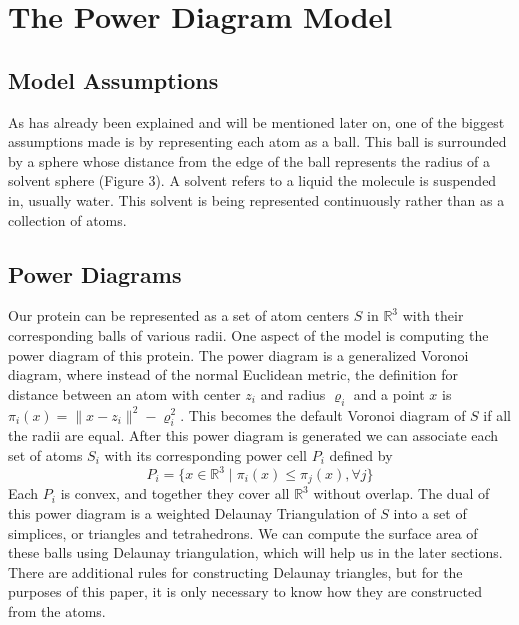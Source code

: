 \documentclass{article}
\newcommand{\R}{\mathbb{R}}
\begin{document}
\section{The Power Diagram Model}
\subsection{Model Assumptions}
As has already been explained and will be mentioned later on, one of the biggest assumptions made is by representing each atom as a ball. This ball is surrounded by a sphere whose distance from the edge of the ball represents the radius of a solvent sphere (Figure 3). A solvent refers to a liquid the molecule is suspended in, usually water. This solvent is being represented continuously rather than as a collection of atoms.
\subsection{Power Diagrams}

Our protein can be represented as a set of atom centers $S$ in $\R^3$ with their corresponding balls of various radii. One aspect of the model is computing the power diagram of this protein. The power diagram is a generalized Voronoi diagram, where instead of the normal Euclidean metric, the definition for distance between an atom with center $z_i$ and radius $\varrho_i$ and a point $x$ is $\pi_i(x)=\|x-z_i\|^2-\varrho_i^2$. This becomes the default Voronoi diagram of $S$ if all the radii are equal. After this power diagram is generated we can associate each set of atoms $S_i$ with its corresponding power cell $P_i$ defined by
\begin{equation*}
P_i=\{x\in\R^3\mid\pi_i(x)\leq\pi_j(x),\forall j\}
\end{equation*}
Each $P_i$ is convex, and together they cover all $\R^3$ without overlap. The dual of this power diagram is a weighted Delaunay Triangulation of $S$ into a set of simplices, or triangles and tetrahedrons. We can compute the surface area of these balls using Delaunay triangulation, which will help us in the later sections. There are additional rules for constructing Delaunay triangles, but for the purposes of this paper, it is only necessary to know how they are constructed from the atoms. 

\end{document}
